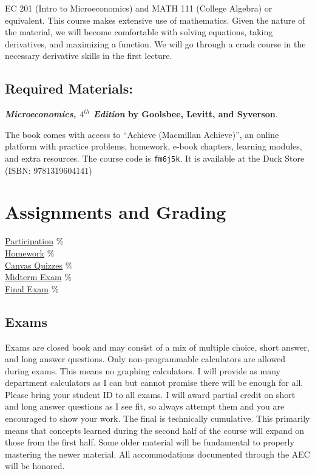 EC 201 (Intro to Microeconomics) and MATH 111 (College Algebra) or equivalent.
This course makes extensive use of mathematics.
Given the nature of the material, we will become comfortable with solving equations, taking derivatives, and maximizing a function.
We will go through a crash course in the necessary derivative skills in the first lecture.

\subsection*{Required Materials:}

\textbf{\textit{Microeconomics, $4^{th}$ Edition} by Goolsbee, Levitt, and Syverson}.

The book comes with access to “Achieve (Macmillan Achieve)”, an online platform with practice problems, homework, e-book chapters, learning modules, and extra resources.
The course code is \texttt{fm6j5k}.
It is available at the Duck Store (ISBN: 9781319604141)

\section{Assignments and Grading} 

\begin{center}\begin{minipage}{3.8in}\begin{flushleft}
    \hyperlink{grading_participation}{Participation} \% \\
    \hyperlink{grading_HW}{Homework}         \% \\
    \hyperlink{grading_quiz}{Canvas Quizzes} \% \\
    \hyperlink{grading_exam}{Midterm Exam}   \% \\
    \hyperlink{grading_exam}{Final Exam}     \% \\
\end{flushleft}\end{minipage}\end{center}

\hypertarget{grading_exam}{\subsection{Exams}}
Exams are closed book and may consist of a mix of multiple choice, short answer, and long answer questions.
Only non-programmable calculators are allowed during exams.
This means no graphing calculators.
I will provide as many department calculators as I can but cannot promise there will be enough for all.
Please bring your student ID to all exams.
I will award partial credit on short and long answer questions as I see fit, so always attempt them and you are encouraged to show your work.
The final is technically cumulative.
This primarily means that concepts learned during the second half of the course will expand on those from the first half.
Some older material will be fundamental to properly mastering the newer material.
All accommodations documented through the AEC will be honored.

